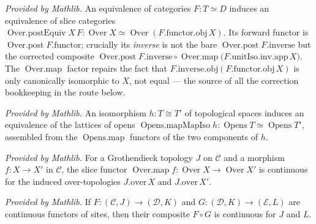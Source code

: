 \begin{lemma}
  \label{lem:over_postEquiv_mathlib}
  \mathlibok
  \textit{Provided by Mathlib.}
  An equivalence of categories \(F : T \simeq D\) induces an equivalence of slice categories
  \(\operatorname{Over.postEquiv} X\,F : \operatorname{Over} X \simeq \operatorname{Over}
  (F.\mathrm{functor}.\mathrm{obj}\, X)\). Its forward functor is \(\operatorname{Over.post}
  F.\mathrm{functor}\); crucially its \emph{inverse} is not the bare \(\operatorname{Over.post}
  F.\mathrm{inverse}\) but the corrected composite \(\operatorname{Over.post} F.\mathrm{inverse}
  \circ \operatorname{Over.map}\bigl(F.\mathrm{unitIso}.\mathrm{inv}.\mathrm{app}\, X\bigr)\). The
  \(\operatorname{Over.map}\) factor repairs the fact that \(F.\mathrm{inverse}.\mathrm{obj}
  (F.\mathrm{functor}.\mathrm{obj}\, X)\) is only canonically isomorphic to \(X\), not equal --- the
  source of all the correction bookkeeping in the route below.
\end{lemma}

\begin{lemma}
  \label{lem:opens_mapMapIso_mathlib}
  \mathlibok
  \textit{Provided by Mathlib.}
  An isomorphism \(h : T \cong T'\) of topological spaces induces an equivalence of the lattices of
  opens \(\operatorname{Opens.mapMapIso} h : \operatorname{Opens} T \simeq \operatorname{Opens} T'\),
  assembled from the \(\operatorname{Opens.map}\) functors of the two components of \(h\).
\end{lemma}

\begin{lemma}
  \label{lem:instIsContinuousOverMapOver_mathlib}
  \mathlibok
  \textit{Provided by Mathlib.}
  For a Grothendieck topology \(J\) on \(\mathcal{C}\) and a morphism \(f : X \to X'\) in
  \(\mathcal{C}\), the slice functor \(\operatorname{Over.map} f : \operatorname{Over} X \to
  \operatorname{Over} X'\) is continuous for the induced over-topologies \(J.\mathrm{over}\,X\) and
  \(J.\mathrm{over}\,X'\).
\end{lemma}

\begin{lemma}
  \label{lem:functor_isContinuous_comp_mathlib}
  \mathlibok
  \textit{Provided by Mathlib.}
  If \(F : (\mathcal{C}, J) \to (\mathcal{D}, K)\) and \(G : (\mathcal{D}, K) \to (\mathcal{E}, L)\)
  are continuous functors of sites, then their composite \(F \circ G\) is continuous for \(J\) and
  \(L\).
\end{lemma}


